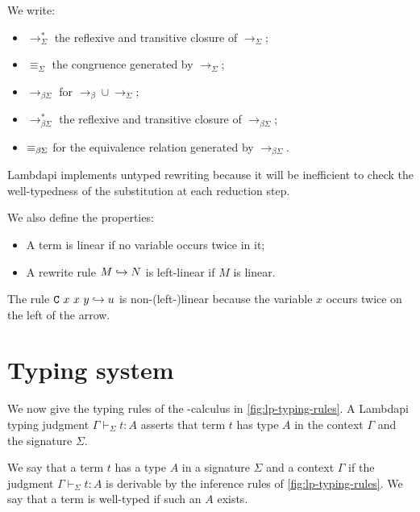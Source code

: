 \begin{notation}
We write:

\begin{itemize}
\item $\longrightarrow^*_{\Sigma}$ the reflexive and transitive closure of $\longrightarrow_\Sigma$;
\item $\equiv_\Sigma$ the congruence generated by $\longrightarrow_{\Sigma}$;
\item $\longrightarrow_{\beta\Sigma}$ for $\longrightarrow_{\beta} \cup \longrightarrow_{\Sigma}$;
\item $\longrightarrow^*_{\beta\Sigma}$ the reflexive and transitive closure of $\longrightarrow_{\beta\Sigma}$;
\item $\equiv_{\beta\Sigma}$ for the equivalence relation generated by $\longrightarrow_{\beta\Sigma}$.
\end{itemize}
\end{notation}

Lambdapi implements untyped rewriting because it will be inefficient to check the well-typedness of the substitution at each reduction step.

\begin{definition}[Linearity]
We also define the properties:
\begin{itemize}
\item A term is linear if no variable occurs twice in it;
\item A rewrite rule $M \hookrightarrow N$ is left-linear if $M$ is linear.
\end{itemize}
\end{definition}

\begin{example}
The rule $\texttt{\upshape{C}}~x~x~y\hookrightarrow u$ is non-(left-)linear because the variable $x$ occurs twice on the left of the arrow.
\end{example}

\section{Typing system}
\label{sect:lambdapi}

We now give the typing rules of the \lpm{}-calculus in \cref{fig:lp-typing-rules}.
A Lambdapi typing judgment $\Gamma \vdash_\Sigma t : A$ asserts that term $t$ has type $A$ in the context $\Gamma$ and the signature $\Sigma$.


\begin{definition}
We say that a term $t$ has a type $A$ in a signature $\Sigma$ and a context $\Gamma$ if the judgment $\Gamma \vdash_\Sigma t: A$ is
derivable by the inference rules of \cref{fig:lp-typing-rules}. We say that a term is well-typed if such an $A$ exists.
\end{definition}

